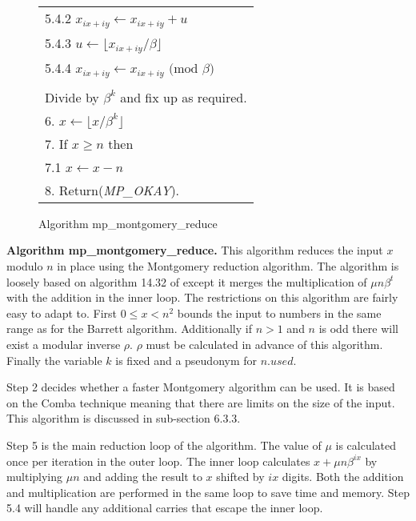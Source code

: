 \documentclass[b5paper]{book}
\begin{document}
\begin{figure}[!here]
\begin{small}
\begin{center}
\begin{tabular}{l}
\hspace{6mm}5.4.2  $x_{ix + iy} \leftarrow x_{ix + iy} + u$ \\
\hspace{6mm}5.4.3  $u \leftarrow \lfloor x_{ix+iy} / \beta \rfloor$ \\
\hspace{6mm}5.4.4  $x_{ix + iy} \leftarrow x_{ix+iy} \mbox{ (mod }\beta\mbox{)}$ \\
\\
Divide by $\beta^k$ and fix up as required. \\
6.  $x \leftarrow \lfloor x / \beta^k \rfloor$ \\
7.  If $x \ge n$ then \\
\hspace{3mm}7.1  $x \leftarrow x - n$ \\
8.  Return(\textit{MP\_OKAY}). \\
\hline
\end{tabular}
\end{center}
\end{small}
\caption{Algorithm mp\_montgomery\_reduce}
\end{figure}

\textbf{Algorithm mp\_montgomery\_reduce.}
This algorithm reduces the input $x$ modulo $n$ in place using the Montgomery reduction algorithm.  The algorithm is loosely based
on algorithm 14.32 of \cite[pp.601]{HAC} except it merges the multiplication of $\mu n \beta^t$ with the addition in the inner loop.  The
restrictions on this algorithm are fairly easy to adapt to.  First $0 \le x < n^2$ bounds the input to numbers in the same range as 
for the Barrett algorithm.  Additionally if $n > 1$ and $n$ is odd there will exist a modular inverse $\rho$.  $\rho$ must be calculated in
advance of this algorithm.  Finally the variable $k$ is fixed and a pseudonym for $n.used$.  

Step 2 decides whether a faster Montgomery algorithm can be used.  It is based on the Comba technique meaning that there are limits on
the size of the input.  This algorithm is discussed in sub-section 6.3.3.

Step 5 is the main reduction loop of the algorithm.  The value of $\mu$ is calculated once per iteration in the outer loop.  The inner loop
calculates $x + \mu n \beta^{ix}$ by multiplying $\mu n$ and adding the result to $x$ shifted by $ix$ digits.  Both the addition and
multiplication are performed in the same loop to save time and memory.  Step 5.4 will handle any additional carries that escape the inner loop.
\end{document}
